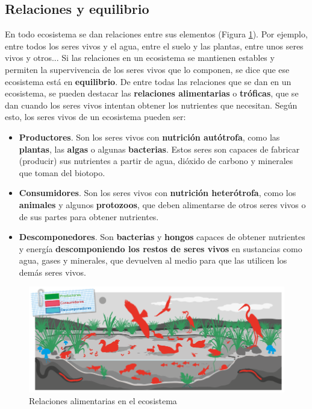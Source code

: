 \subsection{Relaciones y equilibrio}

En todo ecosistema se dan relaciones entre sus elementos (Figura \ref{fig:relaciones-alimentarias-ecosistema}). Por ejemplo, entre todos los seres vivos y el agua, entre el suelo y las plantas, entre unos seres vivos y otros... Si las relaciones en un ecosistema se mantienen estables y permiten la supervivencia de los seres vivos que lo componen, se dice que ese ecosistema está en \textbf{equilibrio}. De entre todas las relaciones que se dan en un ecosistema, se pueden destacar las \textbf{relaciones alimentarias} o \textbf{tróficas}, que se dan cuando los seres vivos intentan obtener los nutrientes que necesitan. Según esto, los seres vivos de un ecosistema pueden ser:
\begin{itemize}
    \item \textbf{Productores}. Son los seres vivos con \textbf{nutrición autótrofa}, como las \textbf{plantas}, las \textbf{algas} o algunas \textbf{bacterias}. Estos seres son capaces de fabricar (producir) sus nutrientes a partir de agua, dióxido de carbono y minerales que toman del biotopo.
    \item \textbf{Consumidores}. Son los seres vivos con \textbf{nutrición heterótrofa}, como los \textbf{animales} y algunos \textbf{protozoos}, que deben alimentarse de otros seres vivos o de sus partes para obtener nutrientes.
    \item \textbf{Descomponedores}. Son \textbf{bacterias} y \textbf{hongos} capaces de obtener nutrientes y energía \textbf{descomponiendo los restos de seres vivos} en sustancias como agua, gases y minerales, que devuelven al medio para que las utilicen los demás seres vivos.
\end{itemize}

\begin{figure}[!ht]
    \centering
    \includegraphics[width=0.8\linewidth]{Tema1/21_Relaciones_alimentarias.png}
    \caption{Relaciones alimentarias en el ecosistema}
    \label{fig:relaciones-alimentarias-ecosistema}
\end{figure}

